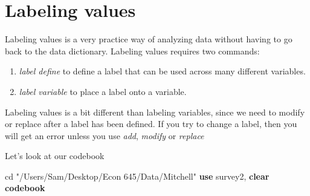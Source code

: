 \documentclass[
]{book}
\newenvironment{Shaded}{\begin{snugshade}}{\end{snugshade}}
\newcommand{\KeywordTok}[1]{\textcolor[rgb]{0.13,0.29,0.53}{\textbf{#1}}}
\newcommand{\NormalTok}[1]{#1}
\newcommand{\StringTok}[1]{\textcolor[rgb]{0.31,0.60,0.02}{#1}}
\providecommand{\tightlist}{%
  \setlength{\itemsep}{0pt}\setlength{\parskip}{0pt}}
\begin{document}
\section{Labeling values}\label{labeling-values}

Labeling values is a very practice way of analyzing data without having to go back to the data dictionary. Labeling values requires two commands:

\begin{enumerate}
\def\labelenumi{\arabic{enumi}.}
\tightlist
\item
  \emph{label define} to define a label that can be used across many different variables.
\item
  \emph{label variable} to place a label onto a variable.
\end{enumerate}

Labeling values is a bit different than labeling variables, since we need to modify or replace after a label has been defined. If you try to change a label, then you will get an error unless you use \emph{add}, \emph{modify} or \emph{replace}

Let's look at our codebook

\begin{Shaded}
\begin{Highlighting}[]
\NormalTok{cd }\StringTok{"/Users/Sam/Desktop/Econ 645/Data/Mitchell"}
\KeywordTok{use}\NormalTok{ survey2, }\KeywordTok{clear}
\KeywordTok{codebook} 
\end{Highlighting}
\end{Shaded}
\end{document}
